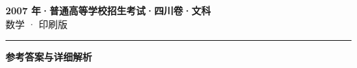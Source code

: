 \documentclass[zihao=5, a4paper]{ctexart}
\begin{document}
\begin{center}
  {\Large\bfseries 2007 年·普通高等学校招生考试·四川卷·文科}\\[4pt]
  {\large 数学 · 印刷版}
\end{center}
\medskip
{}

\par\bigskip\hrule\bigskip
{}
\begin{center}{\large\bfseries 参考答案与详细解析}\end{center}
\smallskip

\end{document}
